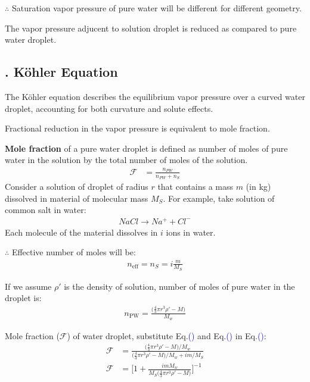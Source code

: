 \documentclass[fleqn,10pt]{SelfArx} %
\newcommand{\myeqref}[1]{\textcolor{blue}{\textup{(\getrefnumber{#1})}}}
\begin{document}
$\therefore$ Saturation vapor pressure of pure water will be different for different geometry.

The vapor pressure adjucent to solution droplet is reduced as compared to pure water droplet. 

\subsection{. K\"{o}hler Equation}
The K\"{o}hler equation describes the equilibrium vapor pressure over a curved water droplet, accounting for both curvature and solute effects.

Fractional reduction in the vapor pressure is equivalent to mole fraction.

\textbf{Mole fraction} of a pure water droplet is defined as number of moles of pure water in the solution by the total number of moles of the solution.
\begin{align}
    \mathcal{F} &= \frac{n_{PW}}{n_{PW}+n_S} \label{eq:mole_fraction}
\end{align}
Consider a solution of droplet of radius $r$ that contains a mass $m$ (in kg) dissolved in material of molecular mass $M_S$.
For example, take solution of common salt in water:
\begin{align*}
    NaCl \rightarrow Na^{+} + Cl^{-}
\end{align*}
Each molecule of the material dissolves in $i$ ions in water.

$\therefore$ Effective number of moles will be:
\begin{align}
    n_{\text{eff}} = n_{S} = i\frac{m}{M_S} \label{eq:n_S}
\end{align}

If we assume $\rho'$ is the density of solution, number of moles of pure water in the droplet is:
\begin{align*}
    n_{\text{PW}} = \frac{\big(\frac{4}{3}\pi r^3 \rho' -M\big)}{M_w} \label{eq:n_PW}
\end{align*}

Mole fraction ($\mathcal{F}$) of water droplet, substitute Eq.\myeqref{eq:n_S} and Eq.\myeqref{eq:n_PW} in Eq.\myeqref{eq:mole_fraction}:
\begin{align}
    \mathcal{F} &= \frac{\big(\frac{4}{3}\pi r^3 \rho' - M\big)/M_w}{\big(\frac{4}{3}\pi r^3 \rho' - M\big)/M_w + im/M_S} \\
    \mathcal{F} &= \Big[1 + \frac{imM_w}{M_S\big(\frac{4}{3}\pi r^3 \rho' - M\big)}\Big]^{-1}
\end{align}
\end{document}
